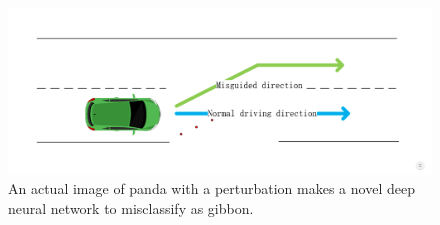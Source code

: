 \begin{enumerate}
            \begin{figure}[htbp]
                \centering
                    \includegraphics[width=\linewidth]{images/example5.png}
                \caption{An actual image of panda with a perturbation makes a novel deep neural network to misclassify as gibbon.}
                \label{fig:example5}
            \end{figure}
	\end{enumerate}

